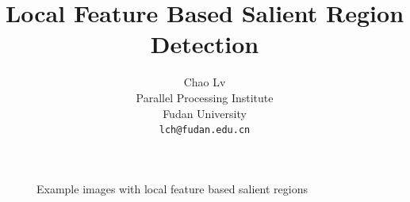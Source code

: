 \documentclass[10pt,twocolumn,letterpaper]{article}
\begin{document}
\title{Local Feature Based Salient Region Detection}

\author{
	\alignauthor
	Chao Lv\\
    Parallel Processing Institute\\
    Fudan University\\
    {\tt\small lch@fudan.edu.cn}
}

\maketitle


\begin{figure}[!t]
	\centering
	\hfil
	\caption{Example images with local feature based salient regions}
	\label{fig:observations}
\end{figure}

















{\small


}
\end{document}
